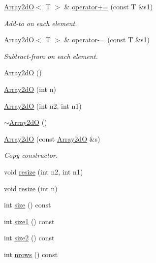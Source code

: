 \begin{DoxyCompactItemize}
\mbox{\hyperlink{classADAT_1_1Array2dO}{Array2dO}}$<$ T $>$ \& \mbox{\hyperlink{classADAT_1_1Array2dO_ae36484e0516c671683a97079f32bd6d8}{operator+=}} (const T \&s1)
\begin{DoxyCompactList}\small\item\em Add-\/to on each element. \end{DoxyCompactList}\item 
\mbox{\hyperlink{classADAT_1_1Array2dO}{Array2dO}}$<$ T $>$ \& \mbox{\hyperlink{classADAT_1_1Array2dO_a5facf357c8c8f28555fe851dce2d039c}{operator-\/=}} (const T \&s1)
\begin{DoxyCompactList}\small\item\em Subtract-\/from on each element. \end{DoxyCompactList}\item 
\mbox{\hyperlink{classADAT_1_1Array2dO_ad54b38527daf48956f3de486768f11b0}{Array2dO}} ()
\item 
\mbox{\hyperlink{classADAT_1_1Array2dO_a4672a22c0a06c8bd84cc4bb60f4f5220}{Array2dO}} (int n)
\item 
\mbox{\hyperlink{classADAT_1_1Array2dO_aeb2cee33d054dc6f4e4db1b8d5b9b06f}{Array2dO}} (int n2, int n1)
\item 
\mbox{\hyperlink{classADAT_1_1Array2dO_a8877788a45155005f08d8b7b02db82b0}{$\sim$\+Array2dO}} ()
\item 
\mbox{\hyperlink{classADAT_1_1Array2dO_a9d759d2058e98b6ce4b2e1a373075bc0}{Array2dO}} (const \mbox{\hyperlink{classADAT_1_1Array2dO}{Array2dO}} \&s)
\begin{DoxyCompactList}\small\item\em Copy constructor. \end{DoxyCompactList}\item 
void \mbox{\hyperlink{classADAT_1_1Array2dO_abccbac468c29e2d8a24b9cd317e92247}{resize}} (int n2, int n1)
\item 
void \mbox{\hyperlink{classADAT_1_1Array2dO_aebe81d1fc5cdfea1b7a36effad3fb2e2}{resize}} (int n)
\item 
int \mbox{\hyperlink{classADAT_1_1Array2dO_a2f8311cdee5283e57e5d13887a463123}{size}} () const
\item 
int \mbox{\hyperlink{classADAT_1_1Array2dO_a8713bf273adbc5e2313e1afd8f88fe7c}{size1}} () const
\item 
int \mbox{\hyperlink{classADAT_1_1Array2dO_a0e743678b1d8c06547715d8929c9b2bf}{size2}} () const
\item 
int \mbox{\hyperlink{classADAT_1_1Array2dO_a8c2e98f898dd0406c9ac9c9e04b1eb0d}{nrows}} () const

\end{DoxyCompactItemize}
